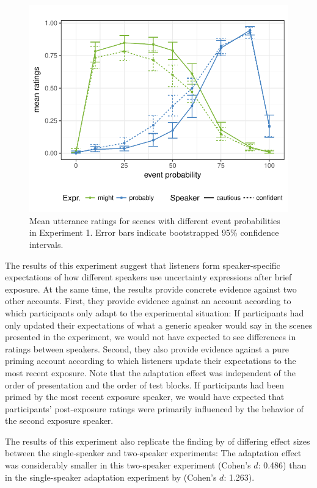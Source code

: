 \documentclass[10pt,letterpaper]{article}
\begin{document}
\begin{figure}
\includegraphics[width=\columnwidth]{plots/exp1-results.pdf}
\caption{Mean utterance ratings for scenes with different event probabilities in Experiment 1. Error bars indicate bootstrapped 95\% confidence intervals. \label{fig:exp1-results}}
\end{figure}

The results of this experiment suggest that listeners form speaker-specific expectations 
of how different speakers use uncertainty expressions after brief exposure. At the same time, the results provide
concrete evidence against two other accounts. First, they provide evidence against an account
according to which participants only adapt to the experimental situation: If participants had only updated 
their expectations of what a generic speaker would say in the scenes presented
in the experiment, we would not have expected to see differences in ratings between speakers. Second, they also 
provide evidence against a pure priming account according to which listeners update their expectations to the most 
recent exposure. Note that the adaptation effect was independent of the order of presentation 
and the order of test blocks. If participants had been primed by the most recent exposure speaker, we would have
expected that participants' post-exposure ratings were primarily influenced by the behavior of the second exposure speaker.


The results of this experiment also replicate the 
finding by  of differing effect sizes between the single-speaker and
two-speaker experiments: The adaptation effect
was considerably smaller in this two-speaker experiment (Cohen's $d$: 0.486) than in 
the single-speaker adaptation experiment by  (Cohen's $d$: 1.263). 
\end{document}
